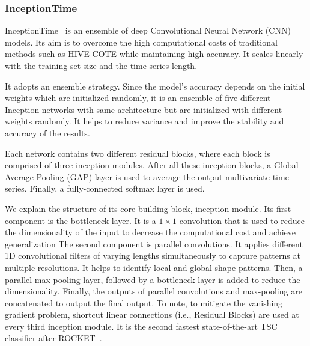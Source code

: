 \subsubsection{InceptionTime} %


InceptionTime~\cite{ismailfawaz2020inceptiontime} is an ensemble of deep Convolutional Neural Network (CNN) models.
Its aim is to overcome the high computational costs of traditional methods such as HIVE-COTE while maintaining high accuracy.
It scales linearly with the training set size and the time series length.

It adopts an ensemble strategy.
Since the model's accuracy depends on the initial weights which are initialized randomly, it is an ensemble of five different Inception networks with same architecture but are initialized with different weights randomly.
It helps to reduce variance and improve the stability and accuracy of the results.

Each network contains two different residual blocks, where each block is comprised of three inception modules.
After all these inception blocks, a Global Average Pooling (GAP) layer is used to average the output multivariate time series.
Finally, a fully-connected softmax layer is used.

We explain the structure of its core building block, inception module.
Its first component is the bottleneck layer. It is a $1 \times 1$ convolution that is used to reduce the dimensionality of the input to decrease the computational cost and achieve generalization
%
The second component is parallel convolutions.
It applies different 1D convolutional filters of varying lengths simultaneously to capture patterns at multiple resolutions.
It helps to identify local and global shape patterns.
%
Then, a parallel max-pooling layer, followed by a bottleneck layer is added to reduce the dimensionality.
%
Finally, the outputs of parallel convolutions and max-pooling are concatenated to output the final output.
To note, to mitigate the vanishing gradient problem, shortcut linear connections (i.e., Residual Blocks) are used at every third inception module.
%
It is the second fastest state-of-the-art TSC classifier after ROCKET~\cite{middlehurst2021hivecote}.

